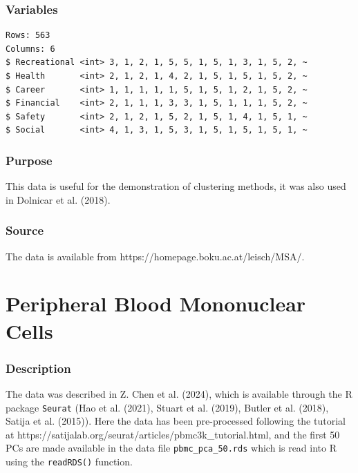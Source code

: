 \documentclass[
  letterpaper,
]{krantz}
\begin{document}
\subsubsection*{Variables}\label{variables-15}

\begin{verbatim}
Rows: 563
Columns: 6
$ Recreational <int> 3, 1, 2, 1, 5, 5, 1, 5, 1, 3, 1, 5, 2, ~
$ Health       <int> 2, 1, 2, 1, 4, 2, 1, 5, 1, 5, 1, 5, 2, ~
$ Career       <int> 1, 1, 1, 1, 1, 5, 1, 5, 1, 2, 1, 5, 2, ~
$ Financial    <int> 2, 1, 1, 1, 3, 3, 1, 5, 1, 1, 1, 5, 2, ~
$ Safety       <int> 2, 1, 2, 1, 5, 2, 1, 5, 1, 4, 1, 5, 1, ~
$ Social       <int> 4, 1, 3, 1, 5, 3, 1, 5, 1, 5, 1, 5, 1, ~
\end{verbatim}

\subsubsection*{Purpose}\label{purpose-15}

This data is useful for the demonstration of clustering methods, it was
also used in Dolnicar et al. (2018).

\subsubsection*{Source}\label{source-15}

The data is available from https://homepage.boku.ac.at/leisch/MSA/.

\section{Peripheral Blood Mononuclear
Cells}\label{peripheral-blood-mononuclear-cells}

\subsubsection*{Description}\label{description-16}

The data was described in Z. Chen et al. (2024), which is available
through the R package \texttt{Seurat} (Hao et al. (2021), Stuart et al.
(2019), Butler et al. (2018), Satija et al. (2015)). Here the data has
been pre-processed following the tutorial at
https://satijalab.org/seurat/articles/pbmc3k\_tutorial.html, and the
first 50 PCs are made available in the data file
\texttt{pbmc\_pca\_50.rds} which is read into R using the
\texttt{readRDS()} function.
\end{document}
